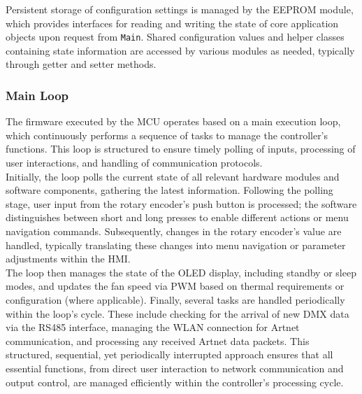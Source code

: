 Persistent storage of configuration settings is managed by the \ac{EEPROM} module, which provides interfaces for reading and writing the state of core application objects upon request from \texttt{Main}. Shared configuration values and helper classes containing state information are accessed by various modules as needed, typically through getter and setter methods.\\

\subsubsection{Main Loop}
The firmware executed by the \ac{MCU} operates based on a main execution loop, which continuously performs a sequence of tasks to manage the controller's functions. This loop is structured to ensure timely polling of inputs, processing of user interactions, and handling of communication protocols. \\

Initially, the loop polls the current state of all relevant hardware modules and software components, gathering the latest information. Following the polling stage, user input from the rotary encoder's push button is processed; the software distinguishes between short and long presses to enable different actions or menu navigation commands. Subsequently, changes in the rotary encoder's value are handled, typically translating these changes into menu navigation or parameter adjustments within the \ac{HMI}. \\

The loop then manages the state of the \ac{OLED} display, including standby or sleep modes, and updates the fan speed via \ac{PWM} based on thermal requirements or configuration (where applicable). Finally, several tasks are handled periodically within the loop's cycle. These include checking for the arrival of new \ac{DMX} data via the \ac{RS485} interface, managing the \ac{WLAN} connection for Artnet communication, and processing any received Artnet data packets. This structured, sequential, yet periodically interrupted approach ensures that all essential functions, from direct user interaction to network communication and output control, are managed efficiently within the controller's processing cycle.

